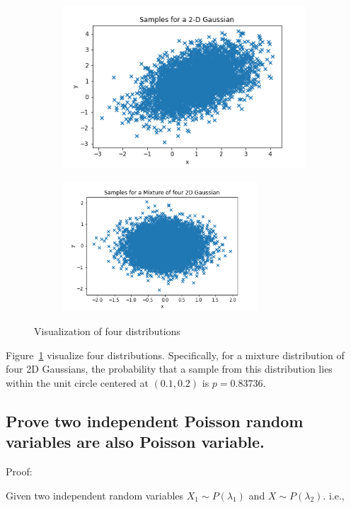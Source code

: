 \documentclass[english,11pt]{article}
\begin{document}
\begin{figure}[h]
\begin{subfigure}{.5\textwidth}
\centering
\includegraphics[width=.8\linewidth]{samplefigs/fig3.png}
\end{subfigure}%
\begin{subfigure}{.5\textwidth}
\centering
\includegraphics[width=0.8\textwidth]{samplefigs/fig4.png}
\end{subfigure}
\caption{Visualization of four distributions}
\label{fig:samplers}
\end{figure}

Figure~\ref{fig:samplers} visualize four distributions. Specifically, for a mixture distribution of four 2D Gaussians, the probability that a sample from this distribution lies within the unit circle centered at $(0.1, 0.2)$ is $p = 0.83736 $.


\subsection{Prove two independent Poisson random variables are also Poisson variable.}

Proof:

Given two independent random variables $X_{1}\sim P(\lambda_{1})$
and $X\sim P(\lambda_{2})$. i.e.,
\end{document}
